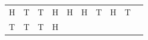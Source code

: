 {\begin{tabular}[t]{|l|l|l|l|l|l|l|l|l|l|}
        H &
        T &
        T &
        H &
        H &
        H &
        T &
        H &
        T%
     \tabularnewline\cline{1-1}\cline{2-2}\cline{3-3}\cline{4-4}\cline{5-5}\cline{6-6}\cline{7-7}\cline{8-8}\cline{9-9}\cline{10-10}
        T &
        T &
        T &
        H &

\end{tabular}}
